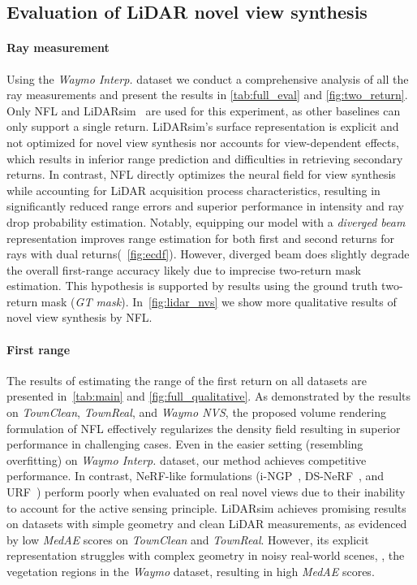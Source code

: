 \subsection{Evaluation of LiDAR novel view synthesis}
\label{sec:lidar_nvs_eval}

\paragraph{Ray measurement}
Using the \emph{Waymo Interp.} dataset we conduct a comprehensive analysis of all the ray measurements and present the results in \cref{tab:full_eval} and \cref{fig:two_return}. Only NFL and LiDARsim~\cite{manivasagam2020lidarsim} are used for this experiment, as other baselines can only support a single return. 
LiDARsim's surface representation is explicit and not optimized for novel view synthesis nor accounts for view-dependent effects, which results in inferior range prediction and difficulties in retrieving secondary returns. In contrast, NFL directly optimizes the neural field for view synthesis while accounting for LiDAR acquisition process characteristics, resulting in significantly reduced range errors and superior performance in intensity and ray drop probability estimation. Notably, equipping our model with a \textit{diverged beam} representation improves range estimation for both first and second returns for rays with dual returns(\cf ~\cref{fig:ecdf}). However, diverged beam does slightly degrade the overall first-range accuracy likely due to imprecise two-return mask estimation. This hypothesis is supported by results using the ground truth two-return mask (\textit{GT mask}). In~\cref{fig:lidar_nvs} we show more qualitative results of novel view synthesis by NFL.


\paragraph{First range}
The results of estimating the range of the first return on all datasets are presented in~\cref{tab:main} and \cref{fig:full_qualitative}. As demonstrated by the results on \textit{TownClean}, \textit{TownReal}, and \textit{Waymo NVS}, the proposed volume rendering formulation of NFL effectively regularizes the density field resulting in superior performance in challenging cases. Even in the easier setting (resembling overfitting) on \textit{Waymo Interp.} dataset, our method achieves competitive performance. In contrast, NeRF-like formulations (i-NGP~\cite{muller2022instant}, DS-NeRF~\cite{deng2021depth}, and URF~\cite{rematas2021urban}) perform poorly when evaluated on real novel views due to their inability to account for the active sensing principle. LiDARsim achieves promising results on datasets with simple geometry and clean LiDAR measurements, as evidenced by low \textit{MedAE} scores on \textit{TownClean} and \textit{TownReal}. However, its explicit representation struggles with complex geometry in noisy real-world scenes, \eg, the vegetation regions in the \textit{Waymo} dataset, resulting in high \textit{MedAE} scores.


